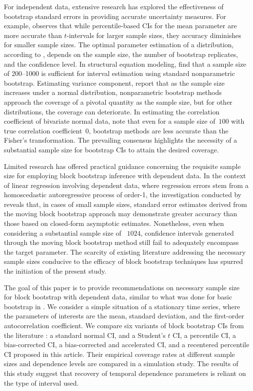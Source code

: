 \documentclass[12pt, letterpaper, titlepage]{article}
\begin{document}
For independent data, extensive research has explored the effectiveness of
bootstrap standard errors in providing accurate uncertainty measures. For
example, \citet{hesterberg2015teachers} observes that while percentile-based
CIs for the mean parameter are more accurate than $t$-intervals for larger
sample sizes, they accuracy diminishes for smaller sample sizes. The optimal
parameter estimation of a distribution, according to
\citet{chernick2009revisiting}, depends on the sample size, the number of
bootstrap replicates, and the confidence level. In structural equation
modeling, \citet{nevitt2001performance} find that a sample size of 200--1000
is sufficient for interval estimation using standard nonparametric bootstrap.
Estimating variance component, \citet{burch2012nonparametric} report that as
the sample size increases under a normal distribution, nonparametric bootstrap
methods approach the coverage of a pivotal quantity as the sample size, but
for other distributions, the coverage can deteriorate. In estimating the
correlation coefficient of bivariate normal data, \citet{puth2015variety} note
that even for a sample size of~$100$ with true correlation coefficient~0,
bootstrap methods are less accurate than the Fisher's transformation. The
prevailing consensus highlights the necessity of a substantial sample size for
bootstrap CIs to attain the desired coverage.


Limited research has offered practical guidance concerning the requisite sample
size for employing block bootstrap inference with dependent data. In the
context of linear regression involving dependent data, where regression errors
stem from a homoscedastic autoregressive process of order-1, the investigation
conducted by \citet{goncalves2005bootstrap} reveals that, in cases of small
sample sizes, standard error estimates derived from the moving block bootstrap
approach may demonstrate greater accuracy than those based on closed-form
asymptotic estimates. Nonetheless, even when considering a substantial sample
size of ~$1024$, confidence intervals generated through the moving block
bootstrap method still fail to adequately encompass the target parameter. The
scarcity of existing literature addressing the necessary sample sizes
conducive to the efficacy of block bootstrap techniques has spurred the
initiation of the present study.


The goal of this paper is to provide recommendations on necessary sample size
for block bootstrap with dependent data, similar to what was done for basic
bootstrap in \citet{hesterberg2015teachers}. We consider a simple situation of
a stationary time series, where the parameters of interests are the mean,
standard deviation, and the first-order autocorrelation coefficient. We
compare six variants of block bootstrap CIs from the literature
\citep{diciccio1996bootstrap, rice2006mathematical}: a standard normal CI, and
a Student's $t$ CI, a percentile CI, a bias-corrected CI, a bias-corrected and
accelerated CI, and a recentered percentile CI proposed in this article.
Their empirical
coverage rates at different sample sizes and dependence levels are compared in
a simulation study. The results of this study suggest that recovery of
temporal dependence parameters is reliant on the type of interval used.
\end{document}
